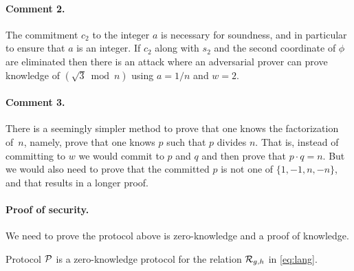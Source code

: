 \documentclass[11pt]{article}
\begin{document}
\paragraph{Comment 2.}
The commitment $c_2$ to the integer $a$ is necessary for soundness,
and in particular to ensure that $a$ is an integer.  If $c_2$ along
with $s_2$ and the second coordinate of $\phi$ are eliminated then there
is an attack where an adversarial prover can prove knowledge of
$(\sqrt{3} \bmod n)$ using $a = 1/n$ and $w = 2$.

\paragraph{Comment 3.}
There is a seemingly simpler method to prove that one knows the
factorization of~$n$, namely, prove that one knows $p$ such that $p$
divides $n$.  That is, instead of committing to $w$ we would commit to
$p$ and $q$ and then prove that $p \cdot q = n$. But we would
also need to prove that the committed $p$ is not one of 
$\{1, -1, n, -n\}$, and that results in a longer proof.

\paragraph{Proof of security.}
We need to prove the protocol above is zero-knowledge and a 
proof of knowledge. 

\begin{theorem}
Protocol $\mathcal{{P}}$ is a zero-knowledge protocol
for the relation ${\cal R}_{g,h}$ in \eqref{eq:lang}.
\end{theorem}
\end{document}
